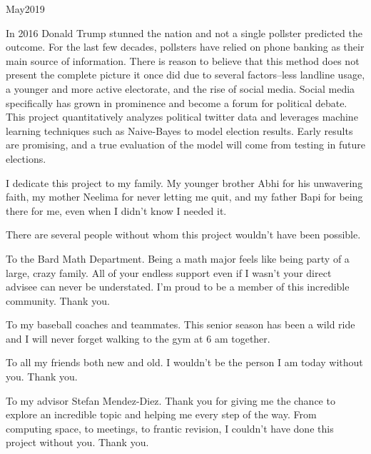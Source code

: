 \documentclass[11pt, twoside, reqno]{book}
\begin{document}
    {May}{2019}

\abstr

In 2016 Donald Trump stunned the nation and not a single pollster predicted the outcome. For the last few decades, pollsters have relied on phone banking as their main source of information. There is reason to believe that this method does not present the complete picture it once did due to several factors--less landline usage, a younger and more active electorate, and the rise of social media. Social media specifically has grown in prominence and become a forum for political debate. This project quantitatively analyzes political twitter data and leverages machine learning techniques such as Naive-Bayes to model election results. Early results are promising, and a true evaluation of the model will come from testing in future elections. 

\tableofcontents

\dedic

I dedicate this project to my family. My younger brother Abhi for his unwavering faith, my mother Neelima for never letting me quit, and my father Bapi for being there for me, even when I didn't know I needed it. 

\acknowl

\hspace{0.2in}There are several people without whom this project wouldn't have been possible. 
\newline

To the Bard Math Department. Being a math major feels like being party of a large, crazy family. All of your endless support even if I wasn't your direct advisee can never be understated. I'm proud to be a member of this incredible community. Thank you. 
\newline

To my baseball coaches and teammates. This senior season has been a wild ride and I will never forget walking to the gym at 6 am together. 
\newline

To all my friends both new and old. I wouldn't be the person I am today without you. Thank you. 
\newline

To my advisor Stefan Mendez-Diez. Thank you for giving me the chance to explore an incredible topic and helping me every step of the way. From computing space, to meetings, to frantic revision, I couldn't have done this project without you. Thank you. 
\newline
\end{document}
